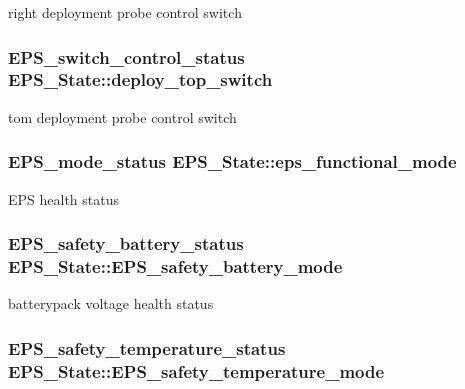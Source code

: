right deployment probe control switch \hypertarget{struct_e_p_s___state_a15d3738512c5160058576a9181727094}{
\subsubsection[{deploy\-\_\-top\-\_\-switch}]{\setlength{\rightskip}{0pt plus 5cm}E\-P\-S\-\_\-switch\-\_\-control\-\_\-status E\-P\-S\-\_\-\-State\-::deploy\-\_\-top\-\_\-switch}}\label{struct_e_p_s___state_a15d3738512c5160058576a9181727094}
tom deployment probe control switch \hypertarget{struct_e_p_s___state_adaea84d5f40622960c5be9cc7363a929}{
\subsubsection[{eps\-\_\-functional\-\_\-mode}]{\setlength{\rightskip}{0pt plus 5cm}E\-P\-S\-\_\-mode\-\_\-status E\-P\-S\-\_\-\-State\-::eps\-\_\-functional\-\_\-mode}}\label{struct_e_p_s___state_adaea84d5f40622960c5be9cc7363a929}
E\-P\-S health status \hypertarget{struct_e_p_s___state_a2edb706363dbdfd7bdd6223cd4d2649d}{
\subsubsection[{E\-P\-S\-\_\-safety\-\_\-battery\-\_\-mode}]{\setlength{\rightskip}{0pt plus 5cm}E\-P\-S\-\_\-safety\-\_\-battery\-\_\-status E\-P\-S\-\_\-\-State\-::\-E\-P\-S\-\_\-safety\-\_\-battery\-\_\-mode}}\label{struct_e_p_s___state_a2edb706363dbdfd7bdd6223cd4d2649d}
batterypack voltage health status \hypertarget{struct_e_p_s___state_a64f6375f3b985adeb31d3f3c6f6ff140}{
\subsubsection[{E\-P\-S\-\_\-safety\-\_\-temperature\-\_\-mode}]{\setlength{\rightskip}{0pt plus 5cm}E\-P\-S\-\_\-safety\-\_\-temperature\-\_\-status E\-P\-S\-\_\-\-State\-::\-E\-P\-S\-\_\-safety\-\_\-temperature\-\_\-mode}}\label{struct_e_p_s___state_a64f6375f3b985adeb31d3f3c6f6ff140}
